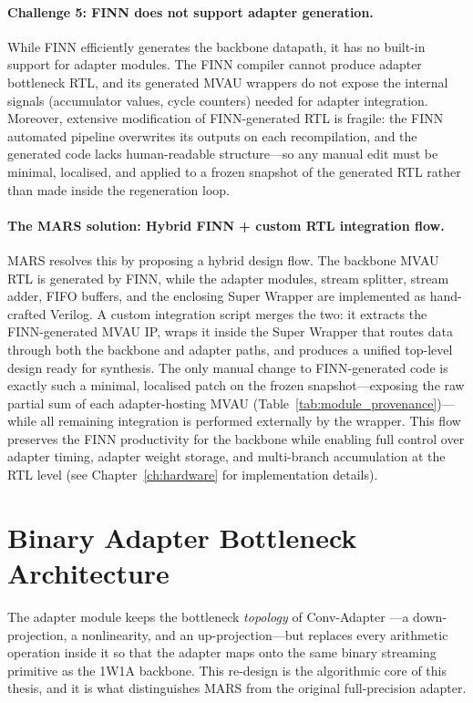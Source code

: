 \documentclass[12pt, a4paper]{report}
\numberwithin{equation}{chapter}
\numberwithin{figure}{chapter}
\numberwithin{table}{chapter}
\numberwithin{algorithm}{chapter}
\begin{document}
\paragraph{Challenge 5: FINN does not support adapter generation.}
While FINN efficiently generates the backbone datapath, it has no built-in support for adapter modules. The FINN compiler cannot produce adapter bottleneck RTL, and its generated MVAU wrappers do not expose the internal signals (accumulator values, cycle counters) needed for adapter integration. Moreover, extensive modification of FINN-generated RTL is fragile: the FINN automated pipeline overwrites its outputs on each recompilation, and the generated code lacks human-readable structure---so any manual edit must be minimal, localised, and applied to a frozen snapshot of the generated RTL rather than made inside the regeneration loop.

\paragraph{The MARS solution: Hybrid FINN + custom RTL integration flow.}
MARS resolves this by proposing a hybrid design flow. The backbone MVAU RTL is generated by FINN, while the adapter modules, stream splitter, stream adder, FIFO buffers, and the enclosing Super Wrapper are implemented as hand-crafted Verilog. A custom integration script merges the two: it extracts the FINN-generated MVAU IP, wraps it inside the Super Wrapper that routes data through both the backbone and adapter paths, and produces a unified top-level design ready for synthesis. The only manual change to FINN-generated code is exactly such a minimal, localised patch on the frozen snapshot---exposing the raw partial sum of each adapter-hosting MVAU (Table~\ref{tab:module_provenance})---while all remaining integration is performed externally by the wrapper. This flow preserves the FINN productivity for the backbone while enabling full control over adapter timing, adapter weight storage, and multi-branch accumulation at the RTL level (see Chapter~\ref{ch:hardware} for implementation details).

\section{Binary Adapter Bottleneck Architecture}
\label{sec:adapter_arch}

The adapter module keeps the bottleneck \emph{topology} of Conv-Adapter \cite{Chen2024ConvAdapter}---a down-projection, a nonlinearity, and an up-projection---but replaces every arithmetic operation inside it so that the adapter maps onto the same binary streaming primitive as the 1W1A backbone. This re-design is the algorithmic core of this thesis, and it is what distinguishes MARS from the original full-precision adapter.
\end{document}
